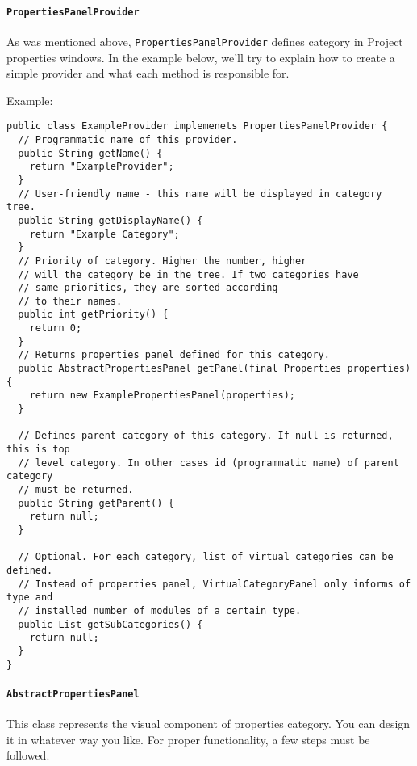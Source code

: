 \documentclass[a4paper,10pt,oneside]{article}
\begin{document}
\paragraph*{\texttt{PropertiesPanelProvider}}
\par 
  As was mentioned above, \texttt{PropertiesPanelProvider} defines
  category in Project properties windows. In the example below, we'll try to
  explain how to create a simple provider and what each method is responsible for.

Example:
\begin{verbatim}
public class ExampleProvider implemenets PropertiesPanelProvider {
  // Programmatic name of this provider.
  public String getName() {
    return "ExampleProvider";
  }
  // User-friendly name - this name will be displayed in category tree.
  public String getDisplayName() {
    return "Example Category";
  }
  // Priority of category. Higher the number, higher
  // will the category be in the tree. If two categories have
  // same priorities, they are sorted according
  // to their names.
  public int getPriority() {
    return 0;
  }
  // Returns properties panel defined for this category.
  public AbstractPropertiesPanel getPanel(final Properties properties) {
    return new ExamplePropertiesPanel(properties);
  }

  // Defines parent category of this category. If null is returned, this is top
  // level category. In other cases id (programmatic name) of parent category
  // must be returned.
  public String getParent() {
    return null;
  }

  // Optional. For each category, list of virtual categories can be defined.
  // Instead of properties panel, VirtualCategoryPanel only informs of type and
  // installed number of modules of a certain type.
  public List getSubCategories() {
    return null;
  }
}
\end{verbatim}

\paragraph*{\texttt{AbstractPropertiesPanel}}
\par 
  This class represents the visual component of properties category. You can
  design it in whatever way you like. For proper functionality, a few steps must
  be followed.
\end{document}

